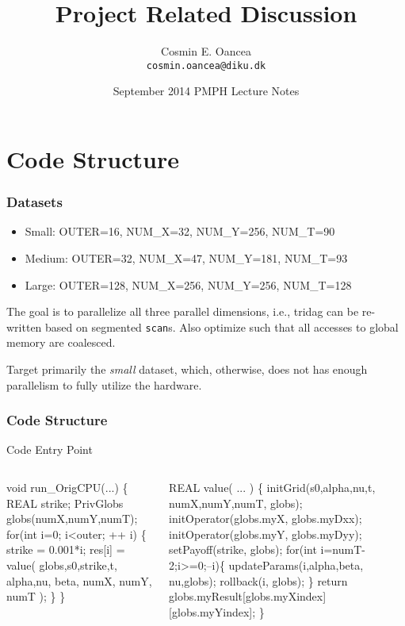 \documentclass{beamer}
\title[Project]{Project Related Discussion}
\author[C.~Oancea]{Cosmin E. Oancea\\{\tt cosmin.oancea@diku.dk}}
\institute{Department of Computer Science (DIKU)\\University of Copenhagen}
\date[Sept 2014]{September 2014 PMPH Lecture Notes}
\renewcommand{\emph}[1]{\textcolor{structure}{#1}}
\newcommand{\emp}[1]{\textcolor{DikuRed}{ #1}}
\begin{document}
\titleslide


\begin{frame}[fragile]
	\tableofcontents
\end{frame}


\section{Code Structure}

\begin{frame}[fragile,t]
  \frametitle{Datasets} %
\begin{itemize}
    \item{Small:} OUTER=16, NUM\_X=32, NUM\_Y=256, NUM\_T=90\medskip
    \item{Medium:} OUTER=32, NUM\_X=47, NUM\_Y=181, NUM\_T=93\medskip
    \item{Large:} OUTER=128, NUM\_X=256, NUM\_Y=256, NUM\_T=128
\end{itemize}\bigskip

The goal is to parallelize all three parallel dimensions, i.e., {\sc tridag}
can be re-written based on segmented {\tt scan}s.  
Also optimize such that all accesses to global memory are coalesced.\medskip

\medskip 
Target primarily the {\em small} dataset, which, otherwise, does not has enough 
parallelism to fully utilize the hardware.

\end{frame}


\begin{frame}[fragile,t]
  \frametitle{Code Structure} %

\begin{block}{Code Entry Point}
\begin{columns}
\begin{colorcode}
void   run_OrigCPU(...) \{
  REAL strike;
  PrivGlobs globs(numX,numY,numT);
  \emph{for(int i=0; i<outer; ++ i)} \{
    strike = 0.001*i;
    res[i] = \emp{value}( globs,s0,strike,t,
                    alpha,nu,   beta,
                    numX, numY, numT );
  \}
\}
\end{colorcode}
\begin{colorcode}
REAL   \emp{value}( ... ) \{
  initGrid(s0,alpha,nu,t, 
           numX,numY,numT, 
           globs);
  initOperator(globs.myX,
               globs.myDxx);
  initOperator(globs.myY,
               globs.myDyy);
  setPayoff(strike, globs);
  \alert{for(int i=numT-2;i>=0;--i)}\{
    updateParams(i,alpha,beta,
                 nu,globs);
    rollback(i, globs);
  \}
  return globs.myResult[globs.myXindex]
                       [globs.myYindex];
\}
\end{colorcode}
\end{columns}
\end{block} 

\end{frame}
\end{document}
